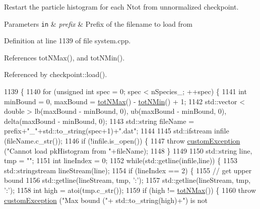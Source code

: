Restart the particle histogram for each Ntot from unnormalized checkpoint. 


\begin{DoxyParams}[1]{Parameters}
\mbox{\tt in}  & {\em prefix} & Prefix of the filename to load from \\
\hline
\end{DoxyParams}


Definition at line 1139 of file system.\-cpp.



References tot\-N\-Max(), and tot\-N\-Min().



Referenced by checkpoint\-::load().


\begin{DoxyCode}
1139                                                           \{
1140     \textcolor{keywordflow}{for} (\textcolor{keywordtype}{unsigned} \textcolor{keywordtype}{int} spec = 0; spec < nSpecies\_; ++spec) \{
1141         \textcolor{keywordtype}{int} minBound = 0, maxBound = \hyperlink{classsim_system_aee2c65ecb43a35c0c4d070cdb45f7dc0}{totNMax}() - \hyperlink{classsim_system_af10842e0eaa638373b8717c87b47e6bc}{totNMin}() + 1;
1142         std::vector < double > lb(maxBound - minBound, 0), ub(maxBound - minBound, 0), delta(maxBound - 
      minBound, 0);
1143         std::string fileName = prefix+\textcolor{stringliteral}{"\_"}+std::to\_string(spec+1)+\textcolor{stringliteral}{".dat"};
1144 
1145         std::ifstream infile (fileName.c\_str());
1146         \textcolor{keywordflow}{if} (!infile.is\_open()) \{
1147             \textcolor{keywordflow}{throw} \hyperlink{classcustom_exception}{customException} (\textcolor{stringliteral}{"Cannot load pkHistogram from "}+fileName);
1148         \}
1149 
1150         std::string line, tmp = \textcolor{stringliteral}{""};
1151         \textcolor{keywordtype}{int} lineIndex = 0;
1152         \textcolor{keywordflow}{while}(std::getline(infile,line)) \{
1153             std::stringstream lineStream(line);
1154             \textcolor{keywordflow}{if} (lineIndex == 2) \{
1155                 \textcolor{comment}{// get upper bound}
1156                 std::getline(lineStream, tmp, \textcolor{charliteral}{':'});
1157                 std::getline(lineStream, tmp, \textcolor{charliteral}{':'});
1158                 \textcolor{keywordtype}{int} high = atoi(tmp.c\_str());
1159                 \textcolor{keywordflow}{if} (high != \hyperlink{classsim_system_aee2c65ecb43a35c0c4d070cdb45f7dc0}{totNMax}()) \{
1160                     \textcolor{keywordflow}{throw} \hyperlink{classcustom_exception}{customException} (\textcolor{stringliteral}{"Max bound ("}+ std::to\_string(high)+\textcolor{stringliteral}{") is not
}
\end{DoxyCode}
